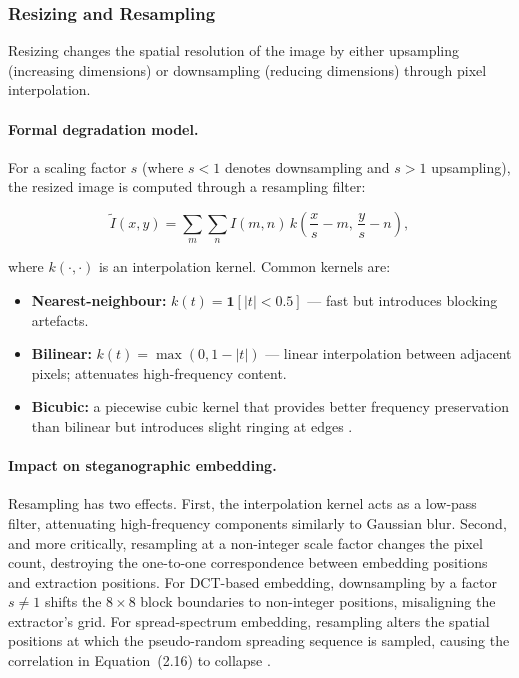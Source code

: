 \documentclass[12pt,a4paper,oneside]{report}
\begin{document}
	\subsubsection{Resizing and Resampling}
	
	Resizing changes the spatial resolution of the image by either upsampling (increasing dimensions)
	or downsampling (reducing dimensions) through pixel interpolation.
	
	\paragraph{Formal degradation model.}
	For a scaling factor $s$ (where $s < 1$ denotes downsampling and $s > 1$ upsampling), the
	resized image is computed through a resampling filter:
	
	\begin{equation}
		\tilde{I}(x,y) = \sum_{m} \sum_{n} I(m,n)\,
		k\!\left(\frac{x}{s} - m,\, \frac{y}{s} - n\right),
		\label{eq:resize}
	\end{equation}
	
	where $k(\cdot, \cdot)$ is an interpolation kernel. Common kernels are:
	
	\begin{itemize}
		\item \textbf{Nearest-neighbour:} $k(t) = \mathbf{1}[|t| < 0.5]$ — fast but introduces
		blocking artefacts.
		\item \textbf{Bilinear:} $k(t) = \max(0, 1 - |t|)$ — linear interpolation between
		adjacent pixels; attenuates high-frequency content.
		\item \textbf{Bicubic:} a piecewise cubic kernel that provides better frequency
		preservation than bilinear but introduces slight ringing at edges \cite{gonzalez2008digital}.
	\end{itemize}
	
	\paragraph{Impact on steganographic embedding.}
	Resampling has two effects. First, the interpolation kernel acts as a low-pass filter, attenuating
	high-frequency components similarly to Gaussian blur. Second, and more critically, resampling at
	a non-integer scale factor changes the pixel count, destroying the one-to-one correspondence
	between embedding positions and extraction positions. For DCT-based embedding, downsampling
	by a factor $s \neq 1$ shifts the $8 \times 8$ block boundaries to non-integer positions,
	misaligning the extractor's grid. For spread-spectrum embedding, resampling alters the spatial
	positions at which the pseudo-random spreading sequence is sampled, causing the correlation in
	Equation~(2.16) to collapse \cite{marvel1999spread}.
	
\end{document}
